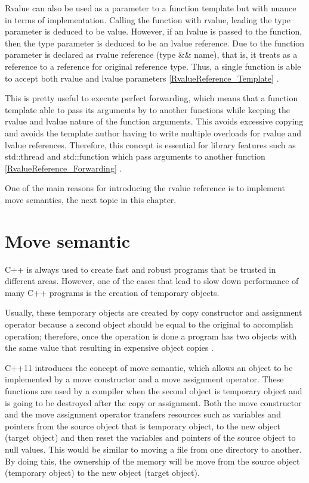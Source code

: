 \documentclass[11pt]{report}
\begin{document}
Rvalue can also be used as a parameter to a function template but with nuance in terms of implementation. Calling the function with rvalue, leading the type parameter is deduced to be value. However, if an lvalue is passed to the function, then the type parameter is deduced to be an lvalue reference. Due to the function parameter is declared as rvalue reference (type \&\& name), that is, it treats as a reference to a reference for original reference type. Thus, a single function is able to accept both rvalue and lvalue parameters \ref{RvalueReference_Template} \cite{Williams:2012:CCA}.
\newline

This is pretty useful to execute perfect forwarding, which means that a function template able to pass its arguments by to another functions while keeping the rvalue and lvalue nature of the function arguments.  This avoids excessive copying and avoids the template author having to write multiple overloads for rvalue and lvalue references. Therefore, this concept is essential for library features such as std::thread and std::function which pass arguments to another function \ref{RvalueReference_Forwarding} \cite{Williams:2012:CCA}.
\newline

One of the main reasons for introducing the rvalue reference is to implement move semantics, the next topic in this chapter.

\section{Move semantic}
\label{section: Move semantic}
C++ is always used to create fast and robust programs that be trusted in different areas.  However, one of the cases that lead to slow down performance of many C++ programs is the creation of temporary objects.
\newline

Usually, these temporary objects are created by copy constructor and assignment operator because a second object should be equal to the original to accomplish operation; therefore, once the operation is done a program has two objects with the same value that resulting in expensive object copies \cite{Stroustrup:2005:Cpp}.
\newline

C++11 introduces the concept of move semantic, which allows an object to be implemented by a move constructor and a move assignment operator. These functions are used by a compiler when the second object is temporary object and is going to be destroyed after the copy or assignment. Both the move constructor and the move assignment operator transfers resources such as variables and pointers from the source object that is temporary object, to the new object (target object) and then reset the variables and pointers of the source object to null values. This would be similar to moving a file from one directory to another. By doing this, the ownership of the memory will be move from the source object (temporary object) to the new object (target object).
\newline
\end{document}
